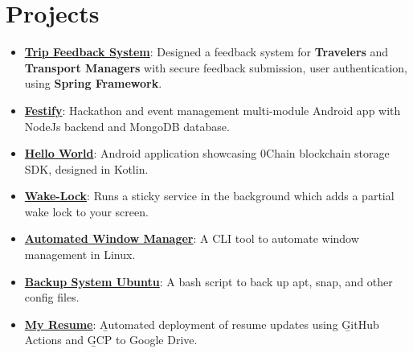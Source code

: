 \documentclass[letterpaper,1pt]{article}
\begin{document}
\section{Projects}
\begin{itemize}[leftmargin=*, itemsep=1pt, parsep=0pt]
  \selectfont\small
  \setlength\itemsep{0em}
  \setlength\parsep{0em}
  \item \href{https://github.com/yash10019coder/TravelSpringBoot}{\textbf{Trip Feedback System}}: Designed a feedback system for \textbf{Travelers} and \textbf{Transport Managers} with secure feedback submission, user authentication, using \textbf{Spring Framework}.
  \item \href{https://github.com/yash10019coder/festify-android}{\textbf{Festify}}: Hackathon and event management multi-module Android app with NodeJs backend and MongoDB database.
  \item \href{https://github.com/0chain/HelloWorld-Android}{\textbf{Hello World}}: Android application showcasing 0Chain blockchain storage SDK, designed in Kotlin.
  \item \href{https://github.com/yash10019coder/Wake-Lock}{\textbf{Wake-Lock}}: Runs a sticky service in the background which adds a partial wake lock to your screen.
  \item \href{https://github.com/yash10019coder/AutomatedWindowManager}{\textbf{Automated Window Manager}}: A CLI tool to automate window management in Linux.
  \item \href{https://github.com/yash10019coder/backup-system-ubuntu}{\textbf{Backup System Ubuntu}}: A bash script to back up apt, snap, and other config files.
  \item \href{https://github.com/yash10019coder/resume}{\textbf{My Resume}}: \b{Automated deployment} of resume updates using \b{GitHub Actions} and \b{GCP} to Google Drive.

\end{itemize}
\end{document}
